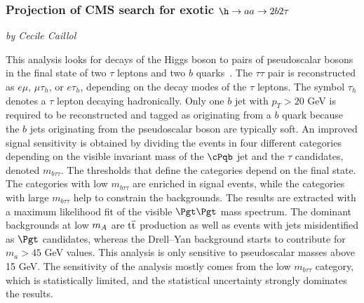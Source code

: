 
\subsubsection{Projection of CMS search for exotic $\h\to aa \to 2b 2\tau$}
\begin{center}
 {\it{ by Cecile Caillol}}
\end{center}

This analysis looks for decays of the Higgs boson to pairs of pseudoscalar bosons in the final state of two
$\tau$ leptons and two $b$ quarks~\cite{Sirunyan:2018pzn}. The $\tau\tau$ pair is reconstructed as $e\mu$, $\mu\tau_h$, or $e\tau_h$, depending on the decay modes of the $\tau$ leptons. The symbol $\tau_h$ denotes a $\tau$ lepton decaying hadronically.
Only one $b$ jet with $p_T>20$ GeV is required to be reconstructed and tagged as originating from a $b$ quark
because the $b$ jets originating from the pseudoscalar boson are typically soft.
An improved signal sensitivity is obtained by dividing the events in four different
categories depending on the visible invariant mass of the $\cPqb$ jet and the $\tau$ candidates, denoted $m_{b\tau\tau}$.
 The thresholds that define the categories depend on the final state.
The categories with low $m_{b\tau\tau}$ are enriched in signal events, while the categories with large $m_{b\tau\tau}$ help to
constrain the backgrounds. The results are extracted with a maximum likelihood fit of the visible $\Pgt\Pgt$ mass spectrum.
The dominant backgrounds at low $m_{A}$ are $\text{t}\overline{\text{t}}$ production as well as events with jets misidentified as $\Pgt$
candidates, whereas the Drell--Yan background starts to contribute for $m_a>45$ GeV values. This analysis
is only sensitive to pseudoscalar masses above 15 GeV. The sensitivity of the analysis mostly comes from the low $m_{b\tau\tau}$
category, which is statistically limited, and the statistical uncertainty strongly dominates the results.

